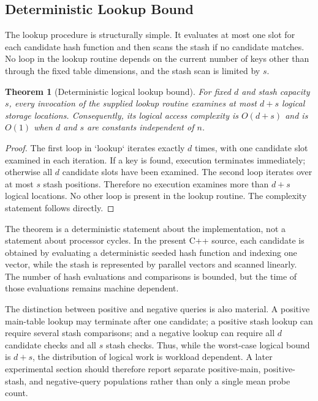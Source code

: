 \documentclass[conference]{IEEEtran}
\newtheorem{theorem}{Theorem}
\begin{document}
\subsection{Deterministic Lookup Bound}

The lookup procedure is structurally simple. It evaluates at most one slot for each candidate hash function and then scans the stash if no candidate matches. No loop in the lookup routine depends on the current number of keys other than through the fixed table dimensions, and the stash scan is limited by $s$.

\begin{theorem}[Deterministic logical lookup bound]
For fixed $d$ and stash capacity $s$, every invocation of the supplied lookup routine examines at most $d+s$ logical storage locations. Consequently, its logical access complexity is $O(d+s)$ and is $O(1)$ when $d$ and $s$ are constants independent of $n$.
\end{theorem}

\begin{proof}
The first loop in `lookup` iterates exactly $d$ times, with one candidate slot examined in each iteration. If a key is found, execution terminates immediately; otherwise all $d$ candidate slots have been examined. The second loop iterates over at most $s$ stash positions. Therefore no execution examines more than $d+s$ logical locations. No other loop is present in the lookup routine. The complexity statement follows directly.
\end{proof}

The theorem is a deterministic statement about the implementation, not a statement about processor cycles. In the present C++ source, each candidate is obtained by evaluating a deterministic seeded hash function and indexing one vector, while the stash is represented by parallel vectors and scanned linearly. The number of hash evaluations and comparisons is bounded, but the time of those evaluations remains machine dependent.

The distinction between positive and negative queries is also material. A positive main-table lookup may terminate after one candidate; a positive stash lookup can require several stash comparisons; and a negative lookup can require all $d$ candidate checks and all $s$ stash checks. Thus, while the worst-case logical bound is $d+s$, the distribution of logical work is workload dependent. A later experimental section should therefore report separate positive-main, positive-stash, and negative-query populations rather than only a single mean probe count.
\end{document}
